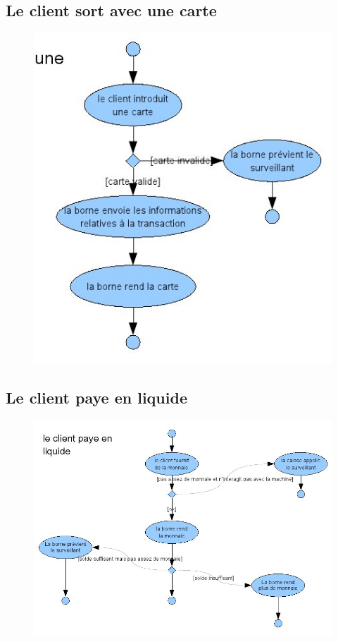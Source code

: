\documentclass[a4paper]{article}
\begin{document}
\subsection{Le client sort avec une carte}
\begin{figure}[!ht]
\centering
\includegraphics[scale=.5]{imgs/act_cartesortir.jpg}
\end{figure}
\newpage
\subsection{Le client paye en liquide}
\begin{figure}[!ht]
\centering
\includegraphics[scale=.5]{imgs/act_payerliquide.jpg}
\end{figure}
\newpage
\end{document}
